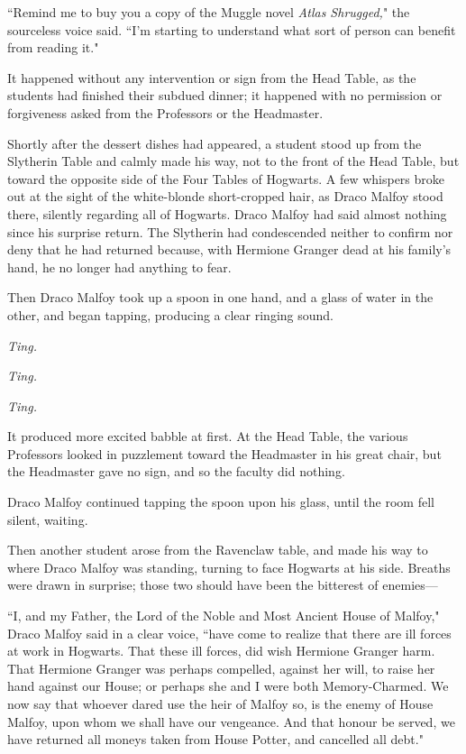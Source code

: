 ``Remind me to buy you a copy of the Muggle novel \emph{Atlas Shrugged,}" the sourceless voice said. ``I'm starting to understand what sort of person can benefit from reading it."


It happened without any intervention or sign from the Head Table, as the students had finished their subdued dinner; it happened with no permission or forgiveness asked from the Professors or the Headmaster.

Shortly after the dessert dishes had appeared, a student stood up from the Slytherin Table and calmly made his way, not to the front of the Head Table, but toward the opposite side of the Four Tables of Hogwarts. A few whispers broke out at the sight of the white-blonde short-cropped hair, as Draco Malfoy stood there, silently regarding all of Hogwarts. Draco Malfoy had said almost nothing since his surprise return. The Slytherin had condescended neither to confirm nor deny that he had returned because, with Hermione Granger dead at his family's hand, he no longer had anything to fear.

Then Draco Malfoy took up a spoon in one hand, and a glass of water in the other, and began tapping, producing a clear ringing sound.

\emph{Ting.}

\emph{Ting.}

\emph{Ting.}

It produced more excited babble at first. At the Head Table, the various Professors looked in puzzlement toward the Headmaster in his great chair, but the Headmaster gave no sign, and so the faculty did nothing.

Draco Malfoy continued tapping the spoon upon his glass, until the room fell silent, waiting.

Then another student arose from the Ravenclaw table, and made his way to where Draco Malfoy was standing, turning to face Hogwarts at his side. Breaths were drawn in surprise; those two should have been the bitterest of enemies—

``I, and my Father, the Lord of the Noble and Most Ancient House of Malfoy," Draco Malfoy said in a clear voice, ``have come to realize that there are ill forces at work in Hogwarts. That these ill forces, did wish Hermione Granger harm. That Hermione Granger was perhaps compelled, against her will, to raise her hand against our House; or perhaps she and I were both Memory-Charmed. We now say that whoever dared use the heir of Malfoy so, is the enemy of House Malfoy, upon whom we shall have our vengeance. And that honour be served, we have returned all moneys taken from House Potter, and cancelled all debt."

